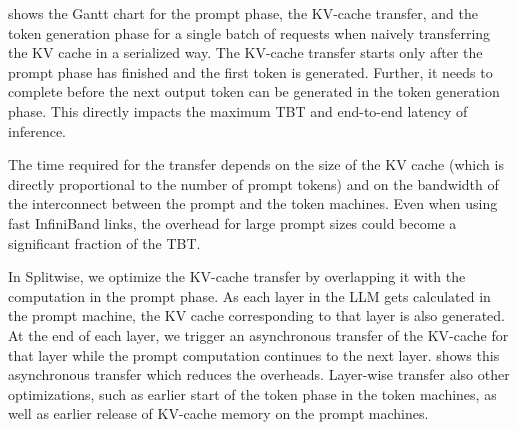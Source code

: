  shows the Gantt chart for the prompt phase, the KV-cache transfer, and the token generation phase for a single batch of requests when naively transferring the KV cache in a serialized way.
The KV-cache transfer starts only after the prompt phase has finished and the first token is generated.
Further, it needs to complete before the next output token can be generated in the token generation phase.
This directly impacts the maximum TBT and end-to-end latency of inference.

The time required for the transfer depends on the size of the KV cache (which is directly proportional to the number of prompt tokens) and on the bandwidth of the interconnect between the prompt and the token machines.
Even when using fast InfiniBand links, the  overhead for large prompt sizes could become a significant fraction of the TBT.

In Splitwise, we optimize the KV-cache transfer by overlapping it with the computation in the prompt phase.
As each layer in the LLM gets calculated in the prompt machine, the KV cache corresponding to that layer is also generated.
At the end of each layer, we trigger an asynchronous transfer of the KV-cache for that layer while the prompt computation continues to the next layer.
 shows this asynchronous transfer which reduces the  overheads.
Layer-wise transfer also  other optimizations, such as earlier start of the token phase in the token machines, as well as earlier release of KV-cache memory on the prompt machines.




